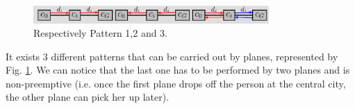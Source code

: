 \documentclass{llncs}
\begin{document}
\begin{figure}
\centering
% 
% 
% 
% 
% 
% 
% 
\includegraphics[width=0.8\textwidth]{patternsZeno.eps}
\caption{\label{M3} Respectively Pattern 1,2 and 3.}
\end{figure}

It exists 3 different patterns that can be carried out by planes, represented by Fig. \ref{M3}. We can notice that the last one has to be performed by two planes and is non-preemptive (i.e. once the first plane drops off the person at the central city, the other plane can pick her up later).
\end{document}
